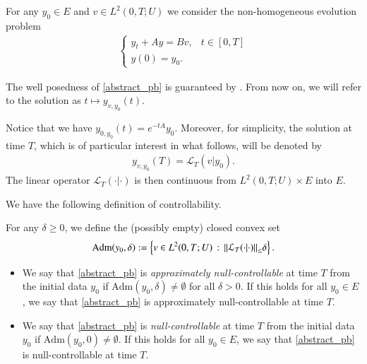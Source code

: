 For any $y_0\in E$ and $v\in L^2(0,T;U)$ we consider the non-homogeneous evolution problem  
\begin{align}\label{abstract_pb}
	\begin{cases}
		y_t+Ay=Bv, & t\in[0,T]
		\\
		y(0)=y_0.
	\end{cases}
\end{align}

The well posedness of \eqref{abstract_pb} is guaranteed by \cite[Theorem 2.37]{coron2007control}. From now on, we will refer to the solution as $t\mapsto y_{v,y_0}(t)$.

Notice that we have $y_{0,y_0}(t)= e^{-tA}y_0$. Moreover, for simplicity, the solution at time $T$, which is of particular interest in what follows, will be denoted by 
\begin{align*}
	y_{v,y_0}(T)=\mathcal{L}_T(v|y_0).
\end{align*} 
The linear operator $\mathcal{L}_T(\cdot|\cdot)$ is then continuous from $L^2(0,T;U)\times E$ into $E$.

We have the following definition of controllability.

\begin{definition}
For any $\delta\geq 0$, we define the (possibly empty) closed convex set 
\begin{align*}
	\textrm{Adm}(y_0,\delta):=\left\{v\in L^2(0,T;U)\,:\, {\left\|\mathcal{L}_T(\cdot|\cdot)\right\|}_{\leq}\delta\right\}.
\end{align*}
\begin{itemize}
	\item We say that \eqref{abstract_pb} is \textit{approximately null-controllable} at time $T$ from the initial data $y_0$ if $\textrm{Adm}(y_0,\delta)\neq\emptyset$ for all $\delta>0$. If this holds for all $y_0\in E$, we say that \eqref{abstract_pb} is approximately null-controllable at time $T$. 
	
	\item We say that \eqref{abstract_pb} is \textit{null-controllable} at time $T$ from the initial data $y_0$ if $\textrm{Adm}(y_0,0)\neq\emptyset$. If this holds for all $y_0\in E$, we say that \eqref{abstract_pb} is null-controllable at time $T$.
\end{itemize} 
\end{definition}

